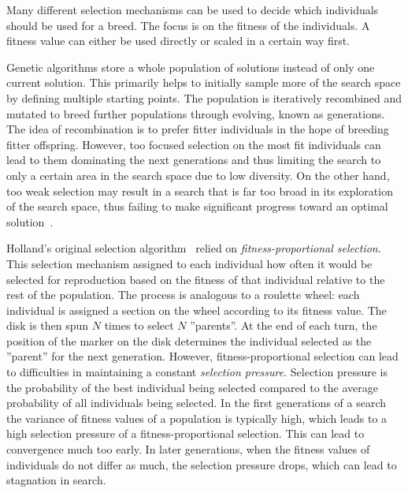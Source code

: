 \documentclass[paper=a4,%
  twoside,%
  BCOR4mm,%
  abstract=true,%
  toc=bibliography,%
  chapterprefix=true,%
  toc=bibliographynumbered,%
  open=right,%
  english,%
  pagesize=pdftex]{scrreprt}
\begin{document}

Many different selection mechanisms can be used to decide which individuals should be used for a breed. The focus is on the fitness of the individuals. A fitness value can either be used directly or scaled in a certain way first.

Genetic algorithms store a whole population of solutions instead of only one current solution. This primarily helps to initially sample more of the search space by defining multiple starting points. The population is iteratively recombined and mutated to breed further populations through evolving, known as generations. The idea of recombination is to prefer fitter individuals in the hope of breeding fitter offspring. However, too focused selection on the most fit individuals can lead to them dominating the next generations and thus limiting the search to only a certain area in the search space due to low diversity. On the other hand, too weak selection may result in a search that is far too broad in its exploration of the search space, thus failing to make significant progress toward an optimal solution~\cite{McMinn_2004}.

Holland's original selection algorithm~\cite{Holland1992} relied on \textit{fitness-proportional selection}. This selection mechanism assigned to each individual how often it would be selected for reproduction based on the fitness of that individual relative to the rest of the population. The process is analogous to a roulette wheel: each individual is assigned a section on the wheel according to its fitness value. The disk is then spun $N$ times to select $N$ ''parents''. At the end of each turn, the position of the marker on the disk determines the individual selected as the ''parent'' for the next generation. However, fitness-proportional selection can lead to difficulties in maintaining a constant \textit{selection pressure}. Selection pressure is the probability of the best individual being selected compared to the average probability of all individuals being selected. In the first generations of a search the variance of fitness values of a population is typically high, which leads to a high selection pressure of a fitness-proportional selection. This can lead to convergence much too early. In later generations, when the fitness values of individuals do not differ as much, the selection pressure drops, which can lead to stagnation in search.
\end{document}
